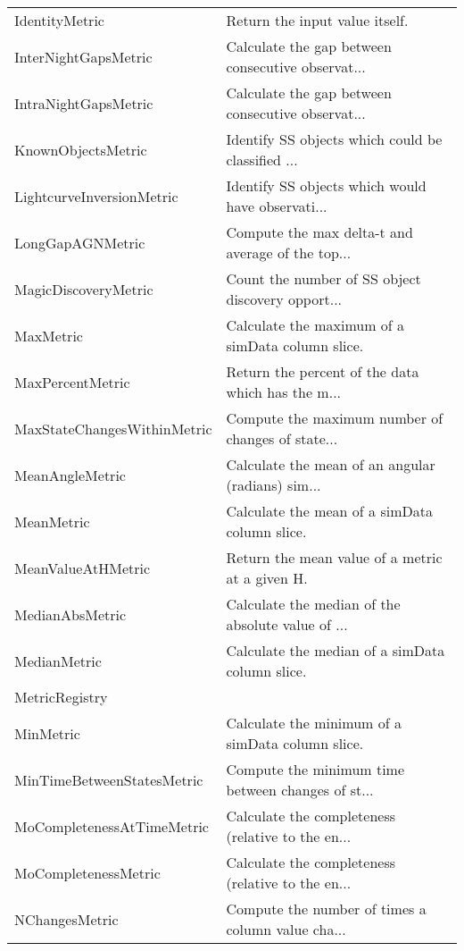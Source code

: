 \begin{tabular}{ll}
                IdentityMetric &                     Return the input value itself. \\
          InterNightGapsMetric &  Calculate the gap between consecutive observat... \\
          IntraNightGapsMetric &  Calculate the gap between consecutive observat... \\
            KnownObjectsMetric &  Identify SS objects which could be classified ... \\
     LightcurveInversionMetric &  Identify SS objects which would have observati... \\
              LongGapAGNMetric &  Compute the max delta-t and average of the top... \\
          MagicDiscoveryMetric &  Count the number of SS object discovery opport... \\
                     MaxMetric &   Calculate the maximum of a simData column slice. \\
              MaxPercentMetric &  Return the percent of the data which has the m... \\
   MaxStateChangesWithinMetric &  Compute the maximum number of changes of state... \\
               MeanAngleMetric &  Calculate the mean of an angular (radians) sim... \\
                    MeanMetric &      Calculate the mean of a simData column slice. \\
            MeanValueAtHMetric &    Return the mean value of a metric at a given H. \\
               MedianAbsMetric &  Calculate the median of the absolute value of ... \\
                  MedianMetric &    Calculate the median of a simData column slice. \\
                MetricRegistry &                                                    \\
                     MinMetric &   Calculate the minimum of a simData column slice. \\
    MinTimeBetweenStatesMetric &  Compute the minimum time between changes of st... \\
    MoCompletenessAtTimeMetric &  Calculate the completeness (relative to the en... \\
          MoCompletenessMetric &  Calculate the completeness (relative to the en... \\
                NChangesMetric &  Compute the number of times a column value cha... \\

\end{tabular}
